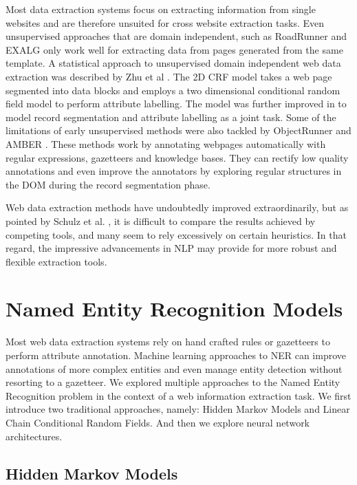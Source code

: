 \documentclass[sigconf]{acmart}
\begin{document}
Most data extraction systems focus on extracting information from single websites
and are therefore unsuited for cross website extraction tasks. Even unsupervised
approaches that are domain independent, such as RoadRunner \cite{Crescenzi2001} 
and EXALG \cite{Arasu2003} only work well for extracting data from pages generated 
from the same template. A statistical approach to unsupervised domain 
independent web data extraction was described by Zhu et al \cite{Zhu2005}. The 2D CRF 
model takes a web page segmented into data blocks and employs a two dimensional conditional 
random field model to perform attribute labelling. The model was further improved in 
\cite{Zhu2006} to model record segmentation and attribute labelling as a joint task.
Some of the limitations of early unsupervised methods 
were also tackled by ObjectRunner \cite{Abdessalem2010} and AMBER \cite{Furche2012}. 
These methods work by annotating webpages automatically with regular expressions, gazetteers and 
knowledge bases. They can rectify low quality annotations and even improve the annotators
by exploring regular structures in the DOM during the record segmentation phase.

Web data extraction methods have undoubtedly improved extraordinarily, but
as pointed by Schulz et al. \cite{Schulz2016}, it is difficult to compare the results 
achieved by competing tools, and many seem to rely excessively on certain heuristics.
In that regard, the impressive advancements in NLP may provide for more robust and
flexible extraction tools.

\section{Named Entity Recognition Models}

Most web data extraction systems rely on hand crafted rules or gazetteers to perform
attribute annotation. Machine learning approaches to NER can improve annotations of 
more complex entities and even manage entity detection without resorting to a gazetteer.
We explored multiple approaches to the Named Entity Recognition problem in the context 
of a web information extraction task. We first introduce two traditional approaches, 
namely: Hidden Markov Models and Linear Chain Conditional Random Fields. And then
we explore neural network architectures.

\subsection{Hidden Markov Models}
\end{document}
